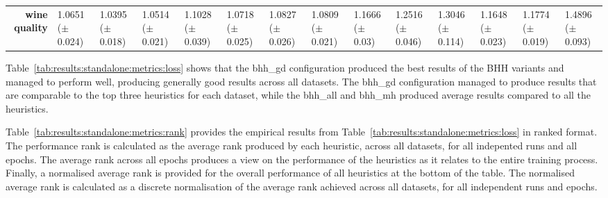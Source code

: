 \begin{sidewaystable}[htbp]
{\begin{tabular}{r|lll|l|l|l|l|l|lllll}
                  \textbf{wine quality}               & \cellcolor[rgb]{ .631,  .816,  .494}1.0651 ($\pm$0.024)                        & \cellcolor[rgb]{ .388,  .745,  .482}1.0395 ($\pm$0.018) & \cellcolor[rgb]{ .502,  .776,  .486}1.0514 ($\pm$0.021) & \cellcolor[rgb]{ 1,  .922,  .518}1.1028 ($\pm$0.039)    & \cellcolor[rgb]{ .698,  .831,  .498}1.0718 ($\pm$0.025) & \cellcolor[rgb]{ .804,  .863,  .506}1.0827 ($\pm$0.026) & \cellcolor[rgb]{ .788,  .859,  .502}1.0809 ($\pm$0.021) & \cellcolor[rgb]{ .996,  .839,  .502}1.1666 ($\pm$0.03)  & \cellcolor[rgb]{ .992,  .725,  .482}1.2516 ($\pm$0.046) & \cellcolor[rgb]{ .988,  .659,  .467}1.3046 ($\pm$0.114) & \cellcolor[rgb]{ .996,  .843,  .502}1.1648 ($\pm$0.023) & \cellcolor[rgb]{ .996,  .824,  .502}1.1774 ($\pm$0.019) & \cellcolor[rgb]{ .973,  .412,  .42}1.4896 ($\pm$0.093)  \\
                  \cmidrule{5-5}\cmidrule{7-7}\cmidrule{9-9}\end{tabular}%
      }
\end{sidewaystable}%

Table~\ref{tab:results:standalone:metrics:loss} shows that the bhh\_gd configuration produced the best results of the \acs{BHH} variants and managed to perform well, producing generally good results across all datasets. The bhh\_gd configuration managed to produce results that are comparable to the top three heuristics for each dataset, while the bhh\_all and bhh\_mh produced average results compared to all the heuristics.

Table~\ref{tab:results:standalone:metrics:rank} provides the empirical results from Table~\ref{tab:results:standalone:metrics:loss} in ranked format. The performance rank is calculated as the average rank produced by each heuristic, across all datasets, for all indepented runs and all epochs. The average rank across all epochs produces a view on the performance of the heuristics as it relates to the entire training process. Finally, a normalised average rank is provided for the overall performance of all heuristics at the bottom of the table. The normalised average rank is calculated as a discrete normalisation of the average rank achieved across all datasets, for all independent runs and epochs.

